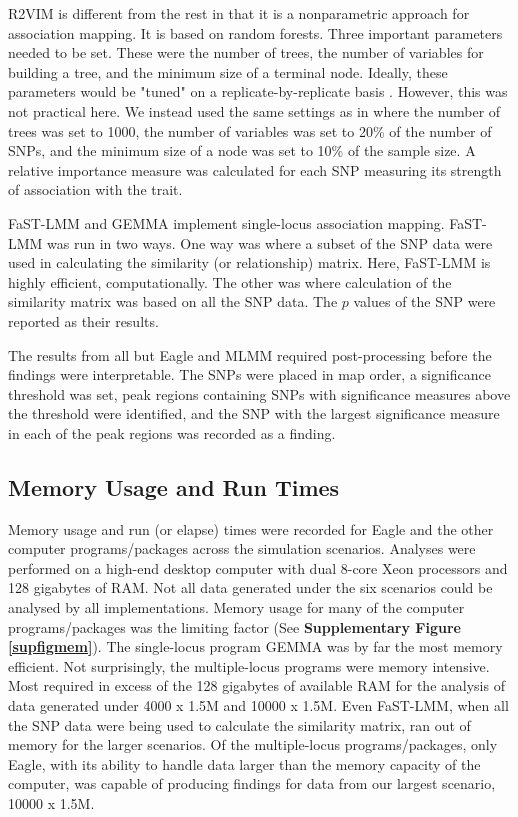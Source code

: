 \documentclass{article}
\begin{document}
R2VIM is different from the rest in that it is a nonparametric approach for association mapping. It is based on random forests. Three important parameters needed to be  set. 
These were the number of trees, the number of variables for building a tree, and the minimum size of a terminal node. Ideally, these parameters would be "tuned" on a replicate-by-replicate 
basis \cite{boulesteix2012overview}. However, this was not practical here. We instead used the same settings as in \cite{szymczak2016r2vim} where 
the number of trees was set to 1000, the number of variables was set to 20\% of the number of SNPs, and 
  the minimum size of a node was set to 10\% of the sample size.
A relative importance measure was calculated 
for each SNP measuring its strength of association with the trait.

FaST-LMM and GEMMA implement single-locus association mapping. 
FaST-LMM was run in two ways. One way was where a subset of the SNP data were used in calculating the similarity (or relationship) matrix. Here, FaST-LMM is 
highly efficient, computationally. 
The other was where calculation of the 
similarity matrix was based on all the SNP data. 
The $p$ values of the SNP were reported as their results. 


The results from all but Eagle and MLMM required post-processing before the findings were interpretable.  The SNPs were placed in map order, 
a significance threshold was set, peak regions containing SNPs with significance measures above the threshold were identified, and the SNP with the largest 
significance measure in each of the peak regions was recorded as a finding. 


 



\subsection{Memory Usage and Run Times}

Memory usage and run (or elapse) times were recorded for Eagle and the other computer programs/packages across the simulation scenarios. 
Analyses were performed on a high-end desktop computer with dual 8-core Xeon processors and 128 gigabytes of RAM. Not all data generated under the six scenarios could be analysed by all implementations. Memory usage 
for many of the computer programs/packages was the limiting factor (See {\bf Supplementary Figure \ref{supfigmem}}).  The single-locus program GEMMA was by 
far the most memory efficient. Not surprisingly, the multiple-locus programs were memory intensive. Most required in 
excess of the 128 gigabytes of available RAM for the analysis of data generated under 4000 x 1.5M and 10000 x 1.5M.  
Even FaST-LMM, when all the SNP data were being used to calculate the similarity matrix, ran out of memory for the larger scenarios.
Of the multiple-locus programs/packages, only Eagle,  
with its ability to handle data larger than the memory capacity of the computer, was capable of producing findings 
for data from our largest scenario, 10000 x 1.5M. 
\end{document}
